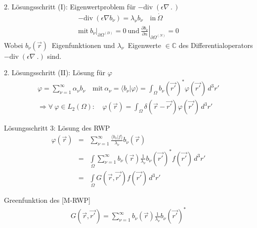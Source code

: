 \documentclass[a6paper]{kartei}
\renewcommand{\div}{\mathrm{div}\;}
\begin{document}
\begin{karte}{2. Lösungsschritt (I): Eigenwertproblem für $-\div (\epsilon \nabla \, . \,)$}
 \begin{eqnarray}
 -\div (\epsilon \nabla b_{\nu}) = \lambda_{\nu} b_{\nu} \quad \text{in} \ \mathring{\Omega} \nonumber \\
 \text{mit} \ b_{\nu}|_{\partial \Omega^{(D)}} = 0 \ \text{und} \ \left. \frac{\partial b_{\nu}}{\partial n} \right|_{\partial \Omega^{(N)}} = 0
\end{eqnarray}
Wobei $b_{\nu}(\vec{r}) \ $ Eigenfunktionen und $\lambda_{\nu} \ $ Eigenwerte $\in \mathbb{C}$ des Differentialoperators $-\div(\epsilon \nabla \ .)$ sind.
\end{karte}

\begin{karte}{2. Lösungsschritt (II): Lösung für $\varphi$}
\begin{eqnarray}
 \varphi = \sum \limits_{\nu = 1}^{\infty} \alpha_{\nu}b_{\nu} \quad \text{mit} \ \alpha_{\nu} = \langle b_{\nu} | \varphi \rangle = \int_{\Omega} b_{\nu}(\vec{r'})^{*} \varphi(\vec{r'}) \, d^{3}r' \\
 \Rightarrow \forall \ \varphi \in L_{2}(\Omega): \quad \varphi(\vec{r}) = \int_{\Omega} \delta(\vec{r} - \vec{r'}) \varphi(\vec{r'}) \, d^{3}r'
\end{eqnarray}
\end{karte}

\begin{karte}{Lösungsschritt 3: Lösung des RWP}
 \begin{eqnarray}
  \varphi(\vec{r}) & = & \sum \limits_{\nu = 1}^{\infty} \frac{\langle b_{v} | f \rangle}{\lambda_{\nu}} b_{\nu}(\vec{r}) \\
  & = & \int \limits_{\Omega} \sum \limits_{\nu = 1}^{\infty} b_{\nu}(\vec{r}) \frac{1}{\lambda_{\nu}} b_{\nu}(\vec{r'})^{*} f(\vec{r'}) \, d^{3}r' \\
  & = & \int \limits_{\Omega} G(\vec{r}, \vec{r'}) f(\vec{r'}) \, d^{3}r' \nonumber
 \end{eqnarray}
\end{karte}

\begin{karte}{Greenfunktion des [M-RWP]}
 \begin{eqnarray}
  G(\vec{r}, \vec{r'}) = \sum \limits_{\nu = 1}^{\infty} b_{\nu}(\vec{r}) \frac{1}{\lambda_{\nu}} b_{\nu}(\vec{r'})^{*}
 \end{eqnarray}

\end{karte}
\end{document}
